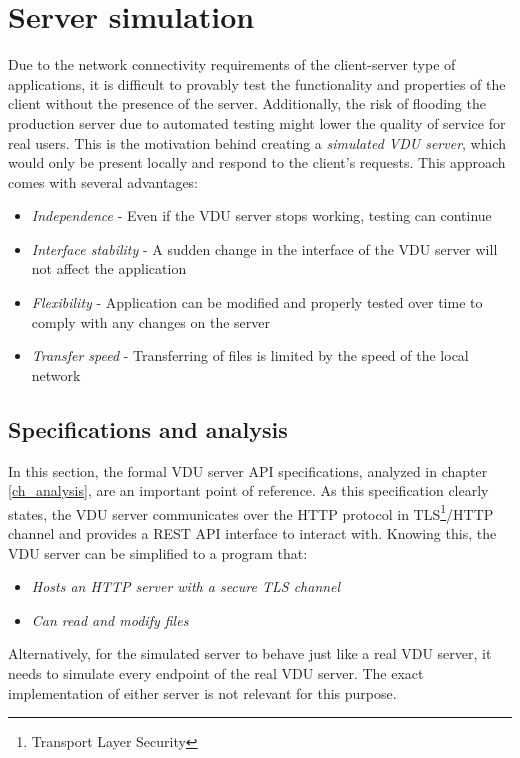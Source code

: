 \section{Server simulation}
Due to the network connectivity requirements of the client-server type of applications, it is difficult to provably test the functionality and properties of the client without the presence of the server. Additionally, the risk of flooding the production server due to automated testing might lower the quality of service for real users. This is the motivation behind creating a \textit{simulated VDU server}, which would only be present locally and respond to the client's requests. This approach comes with several advantages:
\begin{itemize}
    \item \textit{Independence} - Even if the VDU server stops working, testing can continue
    \item \textit{Interface stability} - A sudden change in the interface of the VDU server will not affect the application
    \item \textit{Flexibility} - Application can be modified and properly tested over time to comply with any changes on the server
    \item \textit{Transfer speed} - Transferring of files is limited by the speed of the local network
\end{itemize}

\subsection{Specifications and analysis}
In this section, the formal VDU server API specifications, analyzed in chapter \ref{ch_analysis}, are an important point of reference. As this specification clearly states, the VDU server communicates over the HTTP protocol in TLS\footnote{Transport Layer Security}/HTTP channel and provides a REST API interface to interact with. Knowing this, the VDU server can be simplified to a program that:
\begin{itemize}
    \item \textit{Hosts an HTTP server with a secure TLS channel}
    \item \textit{Can read and modify files}
\end{itemize}
Alternatively, for the simulated server to behave just like a real VDU server, it needs to simulate every endpoint of the real VDU server. The exact implementation of either server is not relevant for this purpose.

